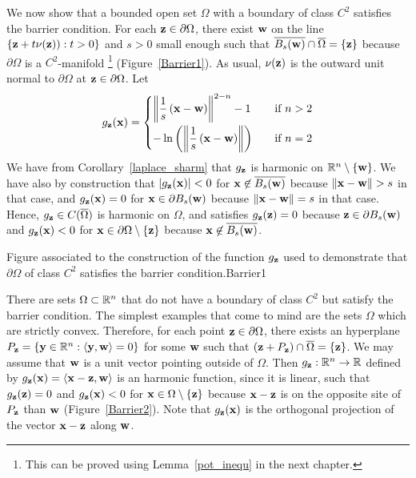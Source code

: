 We now show that a bounded open set $\Omega$ with a boundary of class
$C^2$ satisfies the barrier condition.   For each
$\mathbf{z} \in \partial \Omega$, there exist $\mathbf{w}$ on the line
$\displaystyle \{ \mathbf{z} + t\mathbf{\nu}(\mathbf{z})) : t > 0 \}$
and $s>0$ small enough such that
$\displaystyle \overline{B_s(\mathbf{w})} \cap \overline{\Omega} = \{\mathbf{z}\}$
because $\partial \Omega$ is a $C^2$-manifold \footnote{This can be
proved using Lemma~\ref{pot_inequ} in the next chapter.}
(Figure~\ref{Barrier1}).  As usual, $\mathbf{\nu}(\mathbf{z})$ is the
outward unit normal to $\partial \Omega$ at
$\mathbf{z} \in \partial \Omega$.  Let
\[
g_{\mathbf{z}}(\mathbf{x})
= \begin{cases}
\displaystyle \left\| \frac{1}{s}\,(\mathbf{x}-\mathbf{w}) \right\|^{2-n} - 1
& \quad \text{if} \ n > 2 \\[0.8em]
\displaystyle
-\ln\left(\left\| \frac{1}{s}\, (\mathbf{x} - \mathbf{w}) \right\|\right)
& \quad \text{if} \ n = 2
\end{cases}
\]
We have from Corollary~\ref{laplace_sharm} that
$g_{\mathbf{z}}$ is harmonic on $\mathbb{R}^n\setminus \{\mathbf{w}\}$.
We have also by construction that
$\displaystyle |g_{\mathbf{z}}(\mathbf{x})| < 0$ for
$\mathbf{x} \not\in \overline{B_s(\mathbf{w})}$ because
$\|\mathbf{x} - \mathbf{w}\| > s$ in that case, and
$\displaystyle g_{\mathbf{z}}(\mathbf{x}) = 0$ for
$\mathbf{x} \in \partial B_s(\mathbf{w})$ because
$\|\mathbf{x} - \mathbf{w}\| = s$ in that case.
Hence, $g_{\mathbf{z}} \in C(\overline{\Omega})$ is harmonic on
$\Omega$, and satisfies $g_{\mathbf{z}}(\mathbf{z}) = 0$ because
$\mathbf{z} \in \partial B_s(\mathbf{w})$ and $g_{\mathbf{z}}(\mathbf{x}) < 0$ for 
$\mathbf{x} \in \partial \Omega \setminus \{\mathbf{z}\}$ because
$\mathbf{x} \not\in \overline{B_s(\mathbf{w})}$.

{Figure associated to the construction of the function $g_{\mathbf{z}}$
used to demonstrate that $\partial \Omega$ of class $C^2$ satisfies the
barrier condition.}{Barrier1}

There are sets $\Omega \subset \mathbb{R}^n$ that do not have a boundary of
class $C^2$ but satisfy the barrier condition.  The simplest examples
that come to mind are the sets $\Omega$ which are strictly convex.
Therefore, for each point $\mathbf{z} \in \partial \Omega$, there exists an
hyperplane
$P_{\mathbf{z}} = \left\{ \mathbf{y} \in \mathbb{R}^n : \left\langle{\mathbf{y}} , {\mathbf{w}}\right\rangle = 0 \right\}$
for some $\mathbf{w}$ such that
$(\mathbf{z} + P_{\mathbf{z}}) \cap \overline{\Omega} = \{\mathbf{z}\}$.
We may assume that $\mathbf{w}$ is a unit vector pointing outside of $\Omega$.
Then $g_{\mathbf{z}}:\mathbb{R}^n \to \mathbb{R}$ defined by
$g_{\mathbf{z}}(\mathbf{x}) = \left\langle{\mathbf{x} - \mathbf{z}} , {\mathbf{w}}\right\rangle$ is an
harmonic function, since it is linear, such that
$g_{\mathbf{z}}(\mathbf{z}) = 0$ and
$g_{\mathbf{z}}(\mathbf{x}) < 0$ for $\mathbf{x} \in \Omega \setminus \{\mathbf{z}\}$
because $\mathbf{x}-\mathbf{z}$ is on the opposite site of $P_{\mathbf{z}}$ than
$\mathbf{w}$ (Figure~\ref{Barrier2}).
Note that $g_{\mathbf{z}}(\mathbf{x})$ is the orthogonal projection of the vector 
$\mathbf{x} - \mathbf{z}$ along $\mathbf{w}$.

